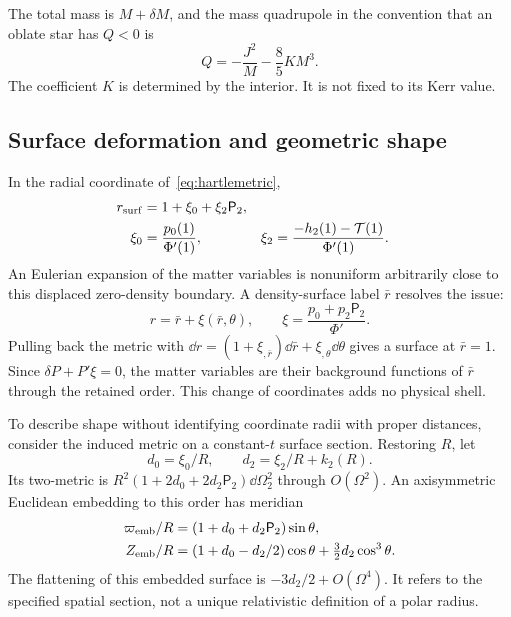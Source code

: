 The total mass is $M+\delta M$, and the mass quadrupole in the convention that an oblate star has $Q<0$ is
\begin{equation}
 Q=-\frac{J^2}{M}-\frac85KM^3.
 \label{eq:quadrupole}
\end{equation}
The coefficient $K$ is determined by the interior. It is not fixed to its Kerr value.

\subsection{Surface deformation and geometric shape}
In the radial coordinate of~\eqref{eq:hartlemetric},
\begin{align}
 r_{\rm surf}&=1+\xi_0+\xi_2\mathsf P_2,\nonumber\\
 \xi_0&=\frac{p_0(1)}{\Phi'(1)},&
 \xi_2&=\frac{-h_2(1)-\mathcal T(1)}{\Phi'(1)}.
 \label{eq:surface}
\end{align}
An Eulerian expansion of the matter variables is nonuniform arbitrarily close to this displaced zero-density boundary. A density-surface label $\bar r$ resolves the issue:
\begin{equation}
 r=\bar r+\xi(\bar r,\theta),\qquad
 \xi=\frac{p_0+p_2\mathsf P_2}{\Phi'}.
 \label{eq:lagrange}
\end{equation}
Pulling back the metric with
$\dd r=(1+\xi_{,\bar r})\dd\bar r+\xi_{,\theta}\dd\theta$
gives a surface at $\bar r=1$. Since $\delta P+P'\xi=0$, the matter variables are their background functions of $\bar r$ through the retained order. This change of coordinates adds no physical shell.

To describe shape without identifying coordinate radii with proper distances, consider the induced metric on a constant-$t$ surface section. Restoring $R$, let
\begin{equation}
 d_0=\xi_0/R,\qquad d_2=\xi_2/R+k_2(R).
\end{equation}
Its two-metric is $R^2(1+2d_0+2d_2\mathsf P_2)\dd\Omega_2^2$ through $O(\Omega^2)$. An axisymmetric Euclidean embedding to this order has meridian
\begin{align}
 \varpi_{\rm emb}/R&=(1+d_0+d_2\mathsf P_2)\sin\theta,\nonumber\\
 Z_{\rm emb}/R&=(1+d_0-d_2/2)\cos\theta
                  +\tfrac32d_2\cos^3\theta.\label{eq:embedding}
\end{align}
The flattening of this embedded surface is $-3d_2/2+O(\Omega^4)$. It refers to the specified spatial section, not a unique relativistic definition of a polar radius.

